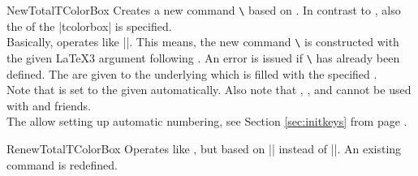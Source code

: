 \begin{docCommand}{NewTotalTColorBox}{}
  Creates a new command \texttt{\textbackslash} based on .
  In contrast to , also the  of the |tcolorbox| is specified.\\
  Basically,  operates like |\NewDocumentCommand|. This means,
  the new command \texttt{\textbackslash} is constructed with the given
  \LaTeX3 argument  following \cite{latexproject:usrguide}.
  An error is issued if \texttt{\textbackslash} has already been defined.
  The  are given to the underlying  which is filled with
  the specified .\\
  Note that  is set to the given 
  automatically.
  Also note that , ,
  and 
  cannot be used with  and friends.\\
  The  allow setting up automatic numbering,
  see Section \ref{sec:initkeys} from page \pageref{sec:initkeys}.

\end{docCommand}

\begin{docCommand}{RenewTotalTColorBox}{}
  Operates like , but based on |\RenewDocumentCommand| instead of |\NewDocumentCommand|.
  An existing command is redefined.
\end{docCommand}

